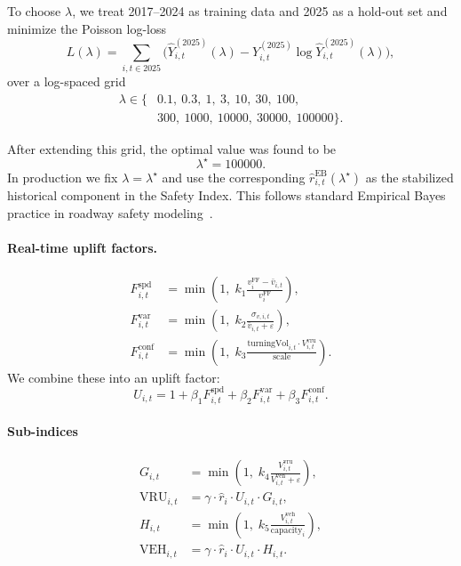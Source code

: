 \documentclass[conference]{IEEEtran}
\begin{document}
To choose $\lambda$, we treat 2017--2024 as training data and 2025 as a
hold-out set and minimize the Poisson log-loss
\begin{equation}
L(\lambda)
=
\sum_{i,t \in \text{2025}}
\Big(
\hat Y_{i,t}^{(2025)}(\lambda)
-
Y_{i,t}^{(2025)}
\log \hat Y_{i,t}^{(2025)}(\lambda)
\Big),
\end{equation}
over a log-spaced grid
\begin{equation}
\begin{aligned}
\lambda \in \{&
0.1,\ 0.3,\ 1,\ 3,\ 10,\ 30,\ 100, \\
&300,\ 1000,\ 10000,\ 30000,\ 100000\}.
\end{aligned}
\end{equation}

After extending this grid, the optimal value was found to be
\[
\lambda^\star = 100000.
\]
In production we fix $\lambda = \lambda^\star$ and use the corresponding
$\hat r^{\text{EB}}_{i,t}(\lambda^\star)$ as the stabilized historical component
in the Safety Index. This follows standard Empirical Bayes practice in roadway safety
modeling~\cite{persaud2007, montella2020systemic}.

\paragraph{Real-time uplift factors.}
\begin{align}
F^{\text{spd}}_{i,t} &= \min\!\left(1,\;k_1\frac{v^{\text{FF}}_i-\bar v_{i,t}}{v^{\text{FF}}_i}\right), \\
F^{\text{var}}_{i,t} &= \min\!\left(1,\;k_2\frac{\sigma_{v,i,t}}{\bar v_{i,t}+\varepsilon}\right), \\
F^{\text{conf}}_{i,t} &= \min\!\left(1,\;k_3\frac{\text{turningVol}_{i,t}\cdot V^{\text{vru}}_{i,t}}{\text{scale}}\right).
\end{align}
We combine these into an uplift factor:
\begin{equation}
U_{i,t} = 1 + \beta_1F^{\text{spd}}_{i,t} + \beta_2F^{\text{var}}_{i,t} + \beta_3F^{\text{conf}}_{i,t}.
\end{equation}

\paragraph{Sub-indices}
\begin{align}
G_{i,t} &= \min\!\left(1,\;k_4\frac{V^{\text{vru}}_{i,t}}{V^{\text{veh}}_{i,t}+\varepsilon}\right), \\
\mathrm{VRU}_{i,t} &= \gamma \cdot \hat r_i \cdot U_{i,t} \cdot G_{i,t}, \\
H_{i,t} &= \min\!\left(1,\;k_5\frac{V^{\text{veh}}_{i,t}}{\mathrm{capacity}_i}\right), \\
\mathrm{VEH}_{i,t} &= \gamma \cdot \hat r_i \cdot U_{i,t} \cdot H_{i,t}.
\end{align}
\end{document}
